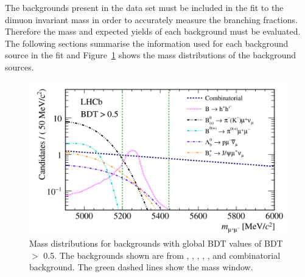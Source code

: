 The backgrounds present in the data set must be included in the fit to the dimuon invariant mass in order to accurately measure the \bmumu branching fractions.
Therefore the mass \pdfs and expected yields of each background must be evaluated. The following sections summarise the information used for each background source in the \BF fit and Figure~\ref{fig:BFbkgnds} shows the mass distributions of the background sources.

\begin{figure}[tbp]
    \centering
     \includegraphics[width= 0.8 \textwidth]{./Figs/BFAnalysis/hidef_Fig4.png}
     \caption{Mass distributions for \bmumu backgrounds with global BDT values of BDT $>$ 0.5. The backgrounds shown are from \bhh, \bdpimunu, \bsKmunu, \lambdab, \bpimumu, \bcjpsimunu and combinatorial background. The green dashed lines show the \bmumu mass window. }
     \label{fig:BFbkgnds}
\end{figure}

